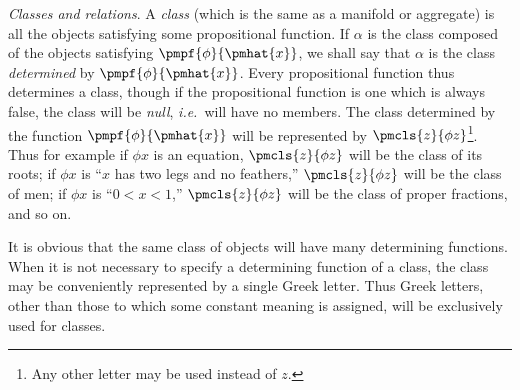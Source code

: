 \documentclass[letterpaper,12pt,openany,leqno]{book}
\begin{document}
\textit{Classes and relations}. A \textit{class} (which is the same as a manifold or aggregate) is all the objects satisfying some propositional function. If $\alpha$ is the class composed of the objects satisfying $\pmpf{\phi}{\pmhat{x}}$, we shall say that $\alpha$ is the class \textit{determined} by $\pmpf{\phi}{\pmhat{x}}$. Every propositional function thus determines a class, though if the propositional function is one which is always false, the class will be \textit{null}, \textit{i.e.}\ will have no members. The class determined by the function $\pmpf{\phi}{\pmhat{x}}$ will be represented by $\pmcls{z}{\phi z}$\footnote{Any other letter may be used instead of $z$.}. Thus for example if $\phi x$ is an equation, $\pmcls{z}{\phi z}$ will be the class of its roots; if $\phi x$ is ``$x$ has two legs and no feathers,'' $\pmcls{z}{\phi z}$ will be the class of men; if $\phi x$ is ``$0 < x < 1$,'' $\pmcls{z}{\phi z}$ will be the class of proper fractions, and so on.

It is obvious that the same class of objects will have many determining functions. When it is not necessary to specify a determining function of a class, the class may be conveniently represented by a single Greek letter. Thus Greek letters, other than those to which some constant meaning is assigned, will be exclusively used for classes.
\end{document}
